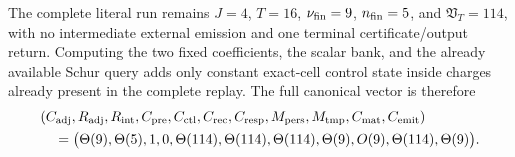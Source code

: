 \begin{proposition}
The complete literal run remains
$J=4$, $T=16$, $\nu_{\rm fin}=9$, $n_{\rm fin}=5$, and
$\mathfrak V_T=114$, with no intermediate external emission and one terminal
certificate/output return.  Computing the two fixed coefficients, the scalar
bank, and the already available Schur query adds only constant exact-cell
control state inside charges already present in the complete replay.  The
full canonical vector is therefore
\begin{equation}
 \begin{aligned}
 &(C_{\rm adj},R_{\rm adj},R_{\rm int},C_{\rm pre},C_{\rm ctl},C_{\rm rec},
 C_{\rm resp},M_{\rm pers},M_{\rm tmp},C_{\rm mat},C_{\rm emit})\\
 &\quad=\bigl(\Theta(9),\Theta(5),1,0,
       \Theta(114),\Theta(114),\Theta(114),
       \Theta(9),O(9),\Theta(114),\Theta(9)\bigr).
 \end{aligned}
 \label{eq:path-tight-pair-schur-bank-eleven-vector}
\end{equation}
\end{proposition}

